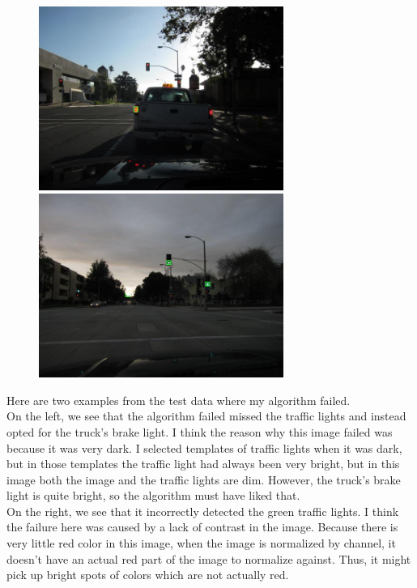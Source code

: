 \documentclass[12pt,letterpaper]{article} \usepackage{fullpage}
\begin{document}
\begin{figure}[htp]
    \centering
    \includegraphics[width=8cm]{img/RL-021.jpg}
    \includegraphics[width=8cm]{img/RL-204.jpg}
\end{figure}

Here are two examples from the test data where my algorithm failed.\\

On the left, we see that the algorithm failed missed the traffic lights and instead
opted for the truck's brake light. I think the reason why this image failed was because
it was very dark. I selected templates of traffic lights when it was dark, but in those
templates the traffic light had always been very bright, but in this image both
the image and the traffic lights are dim. However, the truck's brake light is quite bright,
so the algorithm must have liked that.\\

On the right, we see that it incorrectly detected the green traffic lights. I think the
failure here was caused by a lack of contrast in the image. Because there is very little
red color in this image, when the image is normalized by channel, it doesn't have an actual
red part of the image to normalize against. Thus, it might pick up bright spots of colors
which are not actually red.
\end{document}
